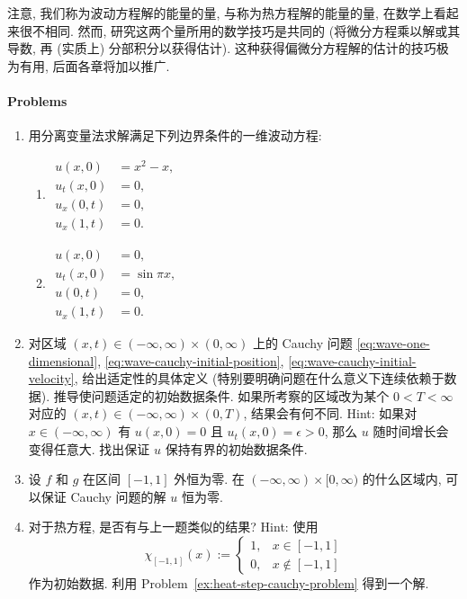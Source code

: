 注意, 我们称为波动方程解的能量的量, 与称为热方程解的能量的量, 在数学上看起来很不相同. 然而, 研究这两个量所用的数学技巧是共同的 (将微分方程乘以解或其导数, 再 (实质上) 分部积分以获得估计). 这种获得偏微分方程解的估计的技巧极为有用, 后面各章将加以推广.

\paragraph*{Problems}

\begin{enumerate}[label=\thesection.\arabic*.,ref=\thesection.\arabic*,start=25,series=book-problems]

\item\label{ex:wave-two-boundary-problems} 用分离变量法求解满足下列边界条件的一维波动方程:\begin{enumerate}[label=(\alph*)]
\item $\begin{aligned}u(x,0)&=x^2-x,\\u_t(x,0)&=0,\\u_x(0,t)&=0,\\u_x(1,t)&=0.\end{aligned}$
\item $\begin{aligned}u(x,0)&=0,\\u_t(x,0)&=\sin\pi x,\\u(0,t)&=0,\\u_x(1,t)&=0.\end{aligned}$
\end{enumerate}

\item\label{ex:wave-cauchy-wellposedness} 对区域 $(x,t)\in(-\infty,\infty)\times(0,\infty)$ 上的 Cauchy 问题 \eqref{eq:wave-one-dimensional}, \eqref{eq:wave-cauchy-initial-position}, \eqref{eq:wave-cauchy-initial-velocity}, 给出适定性的具体定义 (特别要明确问题在什么意义下连续依赖于数据). 推导使问题适定的初始数据条件. 如果所考察的区域改为某个 $0<T<\infty$ 对应的 $(x,t)\in(-\infty,\infty)\times(0,T)$, 结果会有何不同. Hint: 如果对 $x\in(-\infty,\infty)$ 有 $u(x,0)=0$ 且 $u_t(x,0)=\epsilon>0$, 那么 $u$ 随时间增长会变得任意大. 找出保证 $u$ 保持有界的初始数据条件.

\item\label{ex:wave-finite-propagation-region} 设 $f$ 和 $g$ 在区间 $[-1,1]$ 外恒为零. 在 $(-\infty,\infty)\times[0,\infty)$ 的什么区域内, 可以保证 Cauchy 问题的解 $u$ 恒为零.

\item\label{ex:heat-propagation-comparison} 对于热方程, 是否有与上一题类似的结果? Hint: 使用
\[
\chi_{[-1,1]}(x):=\begin{cases}1,&x\in[-1,1]\\0,&x\notin[-1,1]\end{cases}
\]
作为初始数据. 利用 Problem~\ref{ex:heat-step-cauchy-problem} 得到一个解.


\end{enumerate}
